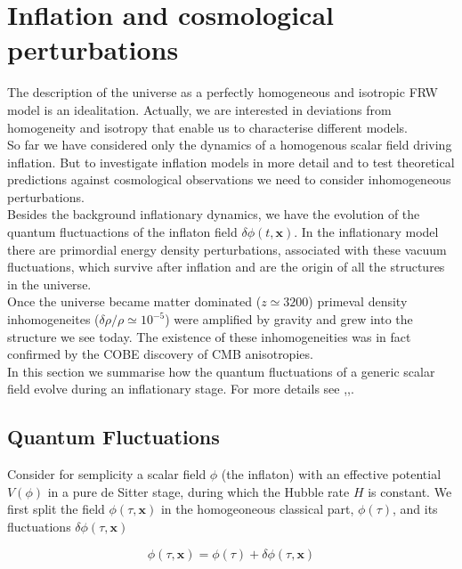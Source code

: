 \documentclass[11pt,a4paper,twoside]{book}
\begin{document}
\section{Inflation and cosmological perturbations}
The description of the universe as a perfectly homogeneous and isotropic FRW model is an idealitation. Actually, we are interested in deviations from homogeneity and isotropy that enable us to characterise different models.\\
So far we have considered only the dynamics of a homogenous scalar field driving inflation. But to investigate inflation models in more detail and to test theoretical predictions against cosmological observations we need to consider inhomogeneous perturbations. \\
Besides the background inflationary dynamics, we have the evolution of the quantum fluctuactions of the inflaton field $ \delta\phi(t,\textbf{x}) $. In the inflationary model there are primordial energy density perturbations, associated with these vacuum fluctuations, which survive after inflation and are the origin of all the structures in the universe.\\
Once the universe became matter dominated ($ z \simeq 3200 $) primeval density inhomogeneites ($ \delta \rho/\rho \simeq 10^{-5} $) were amplified by gravity and grew into the structure we see today. The existence of these inhomogeneities was in fact confirmed by the COBE discovery of CMB anisotropies.\\
In this section we summarise how the quantum fluctuations of a generic scalar field evolve during an inflationary stage. For more details see \cite{Liddle:intro},\cite{NonGauss:Intro},\cite{Dodelson:Chap1}.

\subsection{Quantum Fluctuations}
Consider for semplicity a scalar field $ \phi $ (the inflaton) with an effective potential $ V(\phi) $ in a pure de Sitter stage, during which the Hubble rate $ H $ is constant. 
We first split the field $ \phi(\tau,\textbf{x}) $ in the homogeoneous classical part, $ \phi(\tau) $, and its fluctuations $ \delta\phi(\tau,\textbf{x}) $

\begin{equation}
	\label{splitInflatonTau}
	\phi(\tau,\textbf{x})=\phi(\tau) + \delta \phi(\tau,\textbf{x})
\end{equation}
\end{document}
